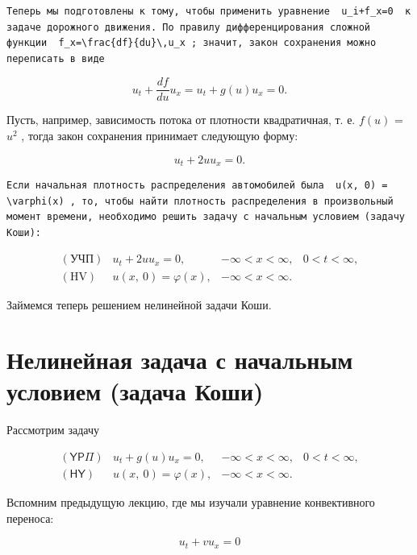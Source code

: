 \documentclass[
  ukrainian,
]{article}
\begin{document}
\begin{verbatim}
Теперь мы подготовлены к тому, чтобы применить уравнение  u_i+f_x=0  к задаче дорожного движения. По правилу дифференцирования сложной функции  f_x=\frac{df}{du}\,u_x ; значит, закон сохранения можно переписать в виде
\end{verbatim}

\[
u_t + \frac{df}{du} u_x = u_t + g(u) u_x = 0.
\]

Пусть, например, зависимость потока от плотности квадратичная, т. е.
\(f(u)\) = \(u^{2}\) , тогда закон сохранения принимает следующую форму:

\[
u_t + 2uu_x = 0.
\]

\begin{verbatim}
Если начальная плотность распределения автомобилей была  u(x, 0) = \varphi(x) , то, чтобы найти плотность распределения в произвольный момент времени, необходимо решить задачу с начальным условием (задачу Коши):
\end{verbatim}

\[
\begin{array}{lll} (\text{УЧП}) & u_t + 2uu_x = 0, & -\infty < x < \infty, & 0 < t < \infty, \\ (\text{HV}) & u\left(x, \ 0\right) = \varphi\left(x\right), & -\infty < x < \infty. \end{array}
\]

Займемся теперь решением нелинейной задачи Коши.

\section{Нелинейная задача с начальным условием (задача
Коши)}\label{ux43dux435ux43bux438ux43dux435ux439ux43dux430ux44f-ux437ux430ux434ux430ux447ux430-ux441-ux43dux430ux447ux430ux43bux44cux43dux44bux43c-ux443ux441ux43bux43eux432ux438ux435ux43c-ux437ux430ux434ux430ux447ux430-ux43aux43eux448ux438}

Рассмотрим задачу

\[
\begin{array}{lll} (\mathsf{Y}\mathsf{P}\Pi) & u_t + g\left(u\right)u_x = 0, & -\infty < x < \infty, & 0 < t < \infty, \\ (\mathsf{H}\mathsf{Y}) & u\left(x, \ 0\right) = \varphi\left(x\right), & -\infty < x < \infty. \end{array}
\]

Вспомним предыдущую лекцию, где мы изучали уравнение конвективного
переноса:

\[
u_t + vu_x = 0
\]
\end{document}
